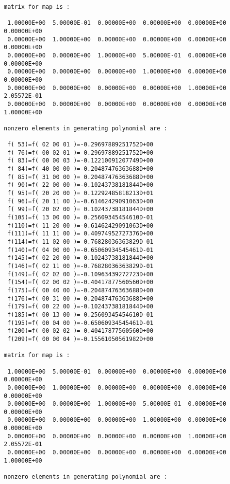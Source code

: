 \begin{footnotesize}
\begin{verbatim}
matrix for map is :

 1.00000E+00  5.00000E-01  0.00000E+00  0.00000E+00  0.00000E+00  0.00000E+00
 0.00000E+00  1.00000E+00  0.00000E+00  0.00000E+00  0.00000E+00  0.00000E+00
 0.00000E+00  0.00000E+00  1.00000E+00  5.00000E-01  0.00000E+00  0.00000E+00
 0.00000E+00  0.00000E+00  0.00000E+00  1.00000E+00  0.00000E+00  0.00000E+00
 0.00000E+00  0.00000E+00  0.00000E+00  0.00000E+00  1.00000E+00  2.05572E-01
 0.00000E+00  0.00000E+00  0.00000E+00  0.00000E+00  0.00000E+00  1.00000E+00

nonzero elements in generating polynomial are :

 f( 53)=f( 02 00 01 )=-0.29697889251752D+00
 f( 76)=f( 00 02 01 )=-0.29697889251752D+00
 f( 83)=f( 00 00 03 )=-0.12210091207749D+00
 f( 84)=f( 40 00 00 )=-0.20487476363688D+00
 f( 85)=f( 31 00 00 )= 0.20487476363688D+00
 f( 90)=f( 22 00 00 )=-0.10243738181844D+00
 f( 95)=f( 20 20 00 )= 0.12292485818213D+01
 f( 96)=f( 20 11 00 )=-0.61462429091063D+00
 f( 99)=f( 20 02 00 )= 0.10243738181844D+00
 f(105)=f( 13 00 00 )= 0.25609345454610D-01
 f(110)=f( 11 20 00 )=-0.61462429091063D+00
 f(111)=f( 11 11 00 )= 0.40974952727376D+00
 f(114)=f( 11 02 00 )=-0.76828036363829D-01
 f(140)=f( 04 00 00 )=-0.65060934545461D-01
 f(145)=f( 02 20 00 )= 0.10243738181844D+00
 f(146)=f( 02 11 00 )=-0.76828036363829D-01
 f(149)=f( 02 02 00 )=-0.10963439272723D+00
 f(154)=f( 02 00 02 )=-0.40417877560560D+00
 f(175)=f( 00 40 00 )=-0.20487476363688D+00
 f(176)=f( 00 31 00 )= 0.20487476363688D+00
 f(179)=f( 00 22 00 )=-0.10243738181844D+00
 f(185)=f( 00 13 00 )= 0.25609345454610D-01
 f(195)=f( 00 04 00 )=-0.65060934545461D-01
 f(200)=f( 00 02 02 )=-0.40417877560560D+00
 f(209)=f( 00 00 04 )=-0.15561050561982D+00

matrix for map is :

 1.00000E+00  5.00000E-01  0.00000E+00  0.00000E+00  0.00000E+00  0.00000E+00
 0.00000E+00  1.00000E+00  0.00000E+00  0.00000E+00  0.00000E+00  0.00000E+00
 0.00000E+00  0.00000E+00  1.00000E+00  5.00000E-01  0.00000E+00  0.00000E+00
 0.00000E+00  0.00000E+00  0.00000E+00  1.00000E+00  0.00000E+00  0.00000E+00
 0.00000E+00  0.00000E+00  0.00000E+00  0.00000E+00  1.00000E+00  2.05572E-01
 0.00000E+00  0.00000E+00  0.00000E+00  0.00000E+00  0.00000E+00  1.00000E+00

nonzero elements in generating polynomial are :


\end{verbatim}
\end{footnotesize}
